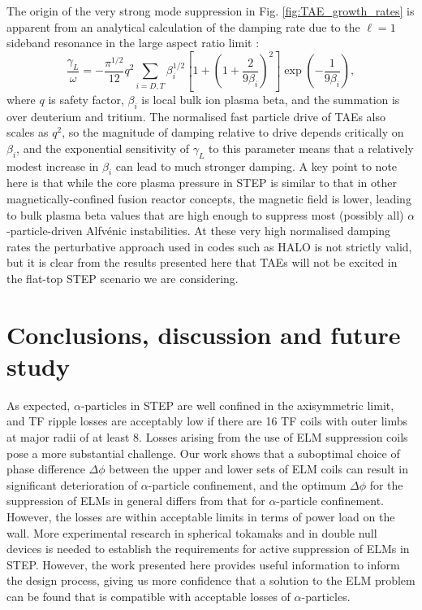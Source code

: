 \documentclass[10pt, a4paper, twoside]{article}
\begin{document}
The origin of the very strong mode suppression in Fig. \ref{fig:TAE_growth_rates} is apparent from an analytical calculation of the damping rate due to the $\ell = 1$ sideband resonance in the large aspect ratio limit \cite{betti1992}:  
\begin{equation}
    \label{eq:Landau_damping}
    \frac{\gamma_L}{\omega} = -\frac{\pi^{1/2}}{12}q^2\sum_{i=D,T}\beta_i^{1/2}\left[1+\left(1+\frac{2}{9\beta_i}\right)^2\right]\exp\left(-\frac{1}{9\beta_i}\right),
\end{equation}
where $q$ is safety factor, $\beta_i$ is local bulk ion plasma beta, and the summation is over deuterium and tritium. The normalised fast particle drive of TAEs also scales as $q^2$, so the magnitude of damping relative to drive depends critically on $\beta_i$, and the exponential sensitivity of $\gamma_L$ to this parameter means that a relatively modest increase in $\beta_i$ can lead to much stronger damping. A key point to note here is that while the core plasma pressure in STEP is similar to that in other magnetically-confined fusion reactor concepts, the magnetic field is lower, leading to bulk plasma beta values that are high enough to suppress most (possibly all) $\alpha$-particle-driven Alfv\'enic instabilities. At these very high normalised damping rates the perturbative approach used in codes such as HALO is not strictly valid, but it is clear from the results presented here that TAEs will not be excited in the flat-top STEP scenario we are considering.

\section{Conclusions, discussion and future study}
\label{sec:discussion_and_conclusions}
 
As expected, $\alpha$-particles in STEP are well confined in the axisymmetric limit, and TF ripple losses are acceptably low if there are 16 TF coils with outer limbs at major radii of at least 8. Losses arising from the use of ELM suppression coils pose a more substantial challenge. Our work shows that a suboptimal choice of phase difference $\Delta\phi$ between the upper and lower sets of ELM coils can result in significant deterioration of $\alpha$-particle confinement, and the optimum $\Delta\phi$ for the suppression of ELMs in general differs from that for $\alpha$-particle confinement. However, the losses are within acceptable limits in terms of power load on the wall. More experimental research in spherical tokamaks and in double null devices is needed to establish the requirements for active suppression of ELMs in STEP. However, the work presented here provides useful information to inform the design process, giving us more confidence that a solution to the ELM problem can be found that is compatible with acceptable losses of $\alpha$-particles.
\end{document}
